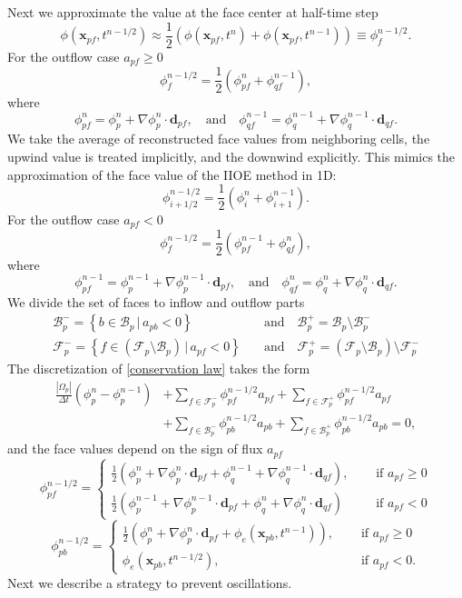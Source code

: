 \documentclass{article}
\begin{document}
Next we approximate the value at the face center at half-time step
\[
	\phi(\boldsymbol{x}_{pf},t^{n-1/2})
	\approx
	\frac{1}{2}(\phi(\boldsymbol{x}_{pf},t^n) + \phi(\boldsymbol{x}_{pf},t^{n-1}))
	\equiv
	\phi_{f}^{n-1/2}.
\]
For the outflow case $ a_{pf} \geq 0 $
\[
	\phi_{f}^{n-1/2} = \frac{1}{2}(\phi_{pf}^n + \phi_{qf}^{n-1}),
\]
where
\[
	\phi_{pf}^{n} = \phi_p^{n} + \nabla\phi_p^{n}\cdot\boldsymbol{d}_{pf},
	\quad \text{and} \quad
	\phi_{qf}^{n-1} = \phi_q^{n-1} + \nabla\phi_q^{n-1}\cdot\boldsymbol{d}_{qf}.
\]
We take the average of reconstructed face values from neighboring cells,
the upwind value is treated implicitly, and the downwind explicitly.
This mimics the approximation of the face value of the IIOE method in 1D:
\[
	\phi_{i+1/2}^{n-1/2} = \frac{1}{2}(\phi_i^{n} + \phi_{i+1}^{n-1}).
\]
For the outflow case $ a_{pf} < 0 $
\[
	\phi_{f}^{n-1/2} = \frac{1}{2}(\phi_{pf}^{n-1} + \phi_{qf}^{n}),
\]
where
\[
	\phi_{pf}^{n-1} = \phi_p^{n-1} + \nabla\phi_p^{n-1}\cdot\boldsymbol{d}_{pf},
	\quad \text{and} \quad
	\phi_{qf}^{n} = \phi_q^{n} + \nabla\phi_q^{n}\cdot\boldsymbol{d}_{qf}.
\]
We divide the set of faces to inflow and outflow parts
\begin{align*}
	\mathcal{B}_p^- = \left\{b \in \mathcal{B}_p\, |\, a_{pb} < 0\right\}\
	\quad &\text{and} \quad
	\mathcal{B}_p^+ = \mathcal{B}_p \setminus \mathcal{B}_p^- \\
	\mathcal{F}_p^- = \left\{f \in (\mathcal{F}_p \setminus \mathcal{B}_p) \, |\, a_{pf} < 0\right\}
	\quad &\text{and} \quad
	\mathcal{F}_p^+ = (\mathcal{F}_p \setminus \mathcal{B}_p) \setminus \mathcal{F}_p^-
\end{align*}
The discretization of \eqref{conservation law} takes the form
\begin{align}
	\nonumber
	\frac{|\Omega_p|}{\Delta t}(\phi_p^{n} - \phi_p^{n-1})
	&+ \sum_{f \in \mathcal{F}_p^-} \phi_{pf}^{n-1/2} a_{pf}
	+ \sum_{f \in \mathcal{F}_p^+} \phi_{pf}^{n-1/2} a_{pf}\\
	&+ \sum_{f \in \mathcal{B}_p^-} \phi_{pb}^{n-1/2} a_{pb}
	+ \sum_{f \in \mathcal{B}_p^+} \phi_{pb}^{n-1/2} a_{pb} = 0,
\end{align}
and the face values depend on the sign of flux $ a_{pf} $
\[
	\phi_{pf}^{n-1/2} =
	\begin{cases}
		\frac{1}{2}(\phi_p^n + \nabla\phi_p^n\cdot\boldsymbol{d}_{pf} +
		\phi_q^{n-1} + \nabla\phi_q^{n-1}\cdot\boldsymbol{d}_{qf}),
		\quad &\text{ if } a_{pf} \geq 0 \\
		\frac{1}{2}(\phi_p^{n-1} + \nabla\phi_p^{n-1}\cdot\boldsymbol{d}_{pf} +
		\phi_q^{n} + \nabla\phi_q^{n}\cdot\boldsymbol{d}_{qf})
		\quad &\text{ if } a_{pf} < 0
	\end{cases}
\]
\[
	\phi_{pb}^{n-1/2} =
	\begin{cases}
		\frac{1}{2}\left(\phi_p^n + \nabla\phi_p^n\cdot\boldsymbol{d}_{pf} +
		\phi_e(\boldsymbol{x}_{pb}, t^{n-1})\right),
		\quad &\text{ if } a_{pf} \geq 0 \\
		\phi_e(\boldsymbol{x}_{pb}, t^{n-1/2}),
		\quad &\text{ if } a_{pf} < 0.
	\end{cases}
\]
Next we describe a strategy to prevent oscillations.\\
\end{document}
